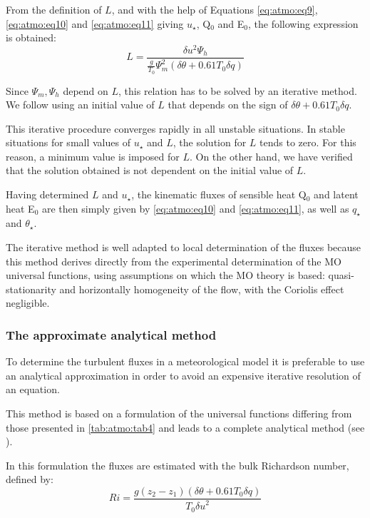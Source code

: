 From the definition of $L$, and with the help of Equations \eqref{eq:atmo:eq9}, \eqref{eq:atmo:eq10} and
\eqref{eq:atmo:eq11} giving $u_\star $, Q$_{0}$ and E$_{0}$, the following
expression is obtained:
\begin{equation}
\label{eq:atmo:eq12}L=\frac{\delta u^{2} \Psi_{h}}{\frac{g}{T_{0}}\Psi_{m}^{2}(\delta {\theta}+0.61 T_{0} \delta {q})}
\end{equation}

Since $\Psi_{m}, \Psi_{h}$ depend on $L$, this
relation has to be solved by an iterative method. We follow \cite{Beljaars:1991}
using an initial value of $L$ that depends on the sign of
$\delta \theta +0.61 T_{0} \delta q$.

This iterative procedure converges rapidly in all unstable situations. In
stable situations for small values of $u_{\star}$ and $L$, the
solution for $L$ tends to zero. For this reason, a minimum value is imposed
for $L$. On the other hand, we have verified that the solution obtained is not
dependent on the initial value of $L$.

Having determined $L$ and $u_{\star}$, the kinematic
fluxes of sensible heat Q$_{0}$ and latent heat E$_{0}$ are then simply
given by \eqref{eq:atmo:eq10} and \eqref{eq:atmo:eq11}, as well as $q_{\star} $and
$\theta_{\star} $.

The iterative method is well adapted to local determination of the fluxes
because this method derives directly from the experimental determination of
the MO universal functions, using assumptions on which the MO theory is
based: quasi-stationarity and horizontally homogeneity of the flow, with the
Coriolis effect negligible.

\subsubsection{The approximate analytical method}
To determine the turbulent fluxes in a meteorological model it is preferable
to use an analytical approximation in order to avoid an expensive iterative
resolution of an equation.

This method is based on a formulation of the universal functions differing
from those presented in \tablename{} \ref{tab:atmo:tab4} and leads to a complete analytical method
(see \cite{Louis:1982}).

In this formulation the fluxes are estimated with the bulk Richardson
number, defined by:
\begin{equation}
\label{eq13}
Ri=\frac{g(z_{2} -z_{1})
({\delta \theta }
+0.61T_{0} \delta q)}
{T_{0} {\delta u}^{2}}
\end{equation}

